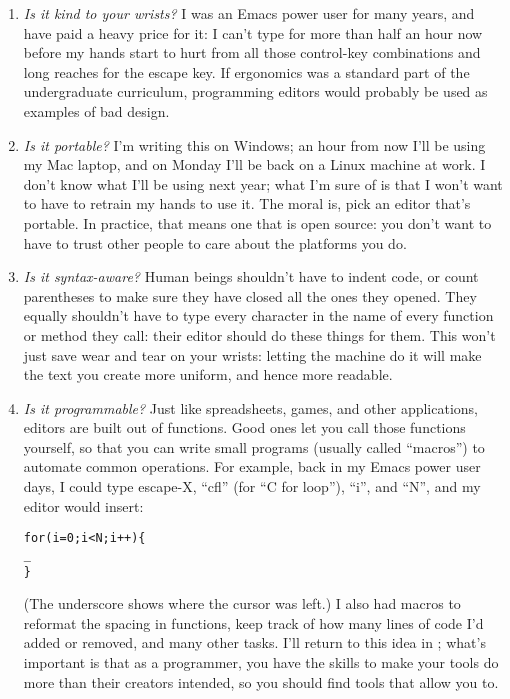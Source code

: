 \documentclass{report}
\begin{document}
\begin{enumerate}

  \item \emph{Is it kind to your wrists?} I was an Emacs power user
  for many years, and have paid a heavy price for it: I can't type for
  more than half an hour now before my hands start to hurt from all
  those control-key combinations and long reaches for the escape key.
  If ergonomics was a standard part of the undergraduate curriculum,
  programming editors would probably be used as examples of bad
  design.

  \item \emph{Is it portable?} I'm writing this on Windows; an hour
  from now I'll be using my Mac laptop, and on Monday I'll be back on
  a Linux machine at work.  I don't know what I'll be using next year;
  what I'm sure of is that I won't want to have to retrain my hands to
  use it.  The moral is, pick an editor that's portable.  In practice,
  that means one that is open source: you don't want to have to trust
  other people to care about the platforms you do.

  \item \emph{Is it syntax-aware?} Human beings shouldn't have to
  indent code, or count parentheses to make sure they have closed all
  the ones they opened.  They equally shouldn't have to type every
  character in the name of every function or method they call: their
  editor should do these things for them.  This won't just save wear
  and tear on your wrists: letting the machine do it will make the
  text you create more uniform, and hence more readable.

  \item \emph{Is it programmable?} Just like spreadsheets, games, and
  other applications, editors are built out of functions.  Good ones
  let you call those functions yourself, so that you can write small
  programs (usually called ``macros'') to automate common
  operations. For example, back in my Emacs power user days, I could
  type escape-X, ``cfl'' (for ``C for loop''), ``i'', and ``N'', and
  my editor would insert:
\begin{alltt}
for (i=0; i<N; i++) \{
    _
\}
\end{alltt}

  \noindent (The underscore shows where the cursor was left.)  I also
  had macros to reformat the spacing in functions, keep track of how
  many lines of code I'd added or removed, and many other tasks.  I'll
  return to this idea in ; what's important is
  that as a programmer, you have the skills to make your tools do more
  than their creators intended, so you should find tools that allow
  you to.


\end{enumerate}
\end{document}
